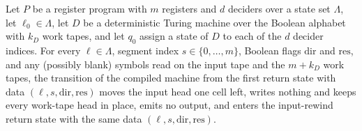 \begin{lemma}
\label{Complexity.LogProg.compileTM_tr_ret1}
\leanok
{}
Let $P$ be a register program with $m$ registers and $d$ deciders over a state set
$\Lambda$, let $\ell_0\in\Lambda$, let $D$ be a deterministic Turing machine over the
Boolean alphabet with $k_D$ work tapes, and let $q_0$ assign a state of $D$ to each of
the $d$ decider indices. For every $\ell\in\Lambda$, segment index
$s\in\{0,\ldots,m\}$, Boolean flags $\mathrm{dir}$ and $\mathrm{res}$, and any (possibly
blank) symbols read on the input tape and the $m+k_D$ work tapes, the transition of the
compiled machine from the first return state with data $(\ell,s,\mathrm{dir},\mathrm{res})$
moves the input head one cell left, writes nothing and keeps every work-tape head in
place, emits no output, and enters the input-rewind return state with the same data
$(\ell,s,\mathrm{dir},\mathrm{res})$.
\end{lemma}

